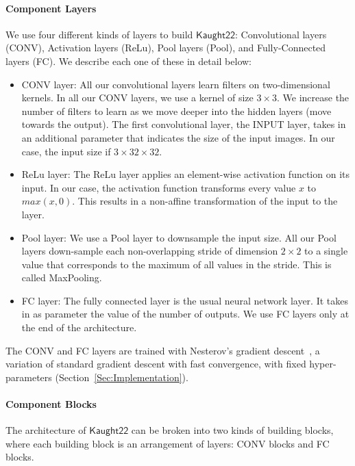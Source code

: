 \documentclass[]{article}
\newcommand*{\K}{\ensuremath{\mathsf{Kaught22}}}
\begin{document}
\paragraph{Component Layers}
We use four different kinds of layers to build $\K$: Convolutional layers (CONV), Activation layers (ReLu), Pool layers (Pool), and Fully-Connected layers (FC). We describe each one of these in detail below:
\begin{itemize}
\item CONV layer: All our convolutional layers learn filters on two-dimensional kernels. In all our CONV layers, we use a kernel of size $3\times 3$. We increase the number of filters to learn as we move deeper into the hidden layers (move towards the output). The first convolutional layer, the INPUT layer, takes in an additional parameter that indicates the size of the input images. In our case, the input size if $3 \times 32 \times 32$. 

\item ReLu layer:  The ReLu layer applies an element-wise activation function on its input. In our case, the activation function transforms every value $x$ to $max(x,0)$. This results in a non-affine transformation of the input to the layer. 

\item  Pool layer: We use a Pool layer to downsample the input size.  All our Pool layers down-sample each non-overlapping stride of dimension $2 \times 2$ to a single value that corresponds to the maximum of all values in the stride. This is called MaxPooling. 

\item FC layer: The fully connected layer is the usual neural network layer. It takes in as parameter the value of the number of outputs. We use FC layers only at the end of the architecture. 
\end{itemize}
The CONV and FC layers are trained with Nesterov's gradient descent~\cite{nesterov2012efficiency}, a variation of standard gradient descent with fast convergence,  with fixed hyper-parameters (Section~\ref{Sec:Implementation}). 

\paragraph{Component Blocks}
The architecture of $\K$ can be broken into two kinds of building blocks, where each building block is an arrangement of layers:
CONV blocks and FC blocks. 
\end{document}

